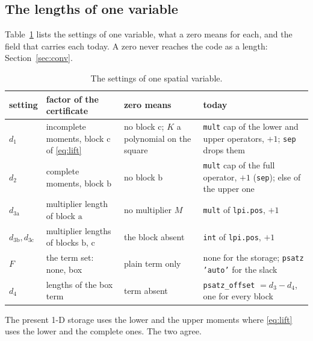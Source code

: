 \documentclass[12pt]{article}
\newcommand{\code}[1]{\texttt{#1}}
\newcommand{\ba}{\mathrm{a}}
\newcommand{\bb}{\mathrm{b}}
\newcommand{\bc}{\mathrm{c}}
\theoremstyle{plain}
\theoremstyle{definition}
\theoremstyle{remark}
\begin{document}
\subsection{The lengths of one variable}\label{sec:knobs}

Table~\ref{tab:knobs} lists the settings of one variable, what a zero means for each, and the field that carries each today. A zero never reaches the code as a length: Section~\ref{sec:conv}.

\begin{table}[h]\centering\footnotesize
\setlength{\tabcolsep}{5pt}
\begin{tabular}{>{\raggedright\arraybackslash}p{1.4cm}>{\raggedright\arraybackslash}p{4.2cm}>{\raggedright\arraybackslash}p{4.2cm}>{\raggedright\arraybackslash}p{5.1cm}}
\toprule
setting & factor of the certificate & zero means & today \\
\midrule
$d_1$ & incomplete moments, block $\bc$ of \eqref{eq:lift} & no block $\bc$; $K$ a polynomial on the square & \code{mult} cap of the lower and upper operators, $+1$; \code{sep} drops them \\
$d_2$ & complete moments, block $\bb$ & no block $\bb$ & \code{mult} cap of the full operator, $+1$ (\code{sep}); else of the upper one \\
$d_{3\ba}$ & multiplier length of block $\ba$ & no multiplier $M$ & \code{mult} of \code{lpi.pos}, $+1$ \\
$d_{3\bb},d_{3\bc}$ & multiplier lengths of blocks $\bb$, $\bc$ & the block absent & \code{int} of \code{lpi.pos}, $+1$ \\
$F$ & the term set: none, box & plain term only & none for the storage; \code{psatz} \code{'auto'} for the slack \\
$d_4$ & lengths of the box term & term absent & \code{psatz\_offset} $=d_3-d_4$, one for every block \\
\bottomrule
\end{tabular}
\caption{The settings of one spatial variable.}\label{tab:knobs}
\end{table}

The present 1-D storage uses the lower and the upper moments where \eqref{eq:lift} uses the lower and the complete ones. The two agree.
\end{document}
